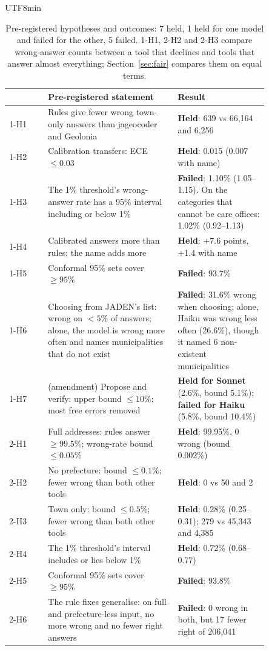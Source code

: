 \documentclass[10pt]{article}
\begin{document}
\begin{CJK}{UTF8}{min}
\begin{table}[t]
\centering\small
\begin{tabular}{@{}l>{\raggedright\arraybackslash}p{0.5\linewidth}>{\raggedright\arraybackslash}p{0.35\linewidth}@{}}
\toprule
& Pre-registered statement & Result \\
\midrule
1-H1 & Rules give fewer wrong town-only answers than jageocoder and Geolonia & \textbf{Held}: 639 vs 66,164 and 6,256 \\
1-H2 & Calibration transfers: ECE $\le 0.03$ & \textbf{Held}: 0.015 (0.007 with name) \\
1-H3 & The 1\% threshold's wrong-answer rate has a 95\% interval including or below 1\% & \textbf{Failed}: 1.10\% (1.05--1.15). On the categories that cannot be care offices: 1.02\% (0.92--1.13) \\
1-H4 & Calibrated answers more than rules; the name adds more & \textbf{Held}: +7.6 points, +1.4 with name \\
1-H5 & Conformal 95\% sets cover $\ge 95\%$ & \textbf{Failed}: 93.7\% \\
1-H6 & Choosing from JADEN's list: wrong on $<5\%$ of answers; alone, the model is wrong more often and names municipalities that do not exist & \textbf{Failed}: 31.6\% wrong when choosing; alone, Haiku was wrong less often (26.6\%), though it named 6 non-existent municipalities \\
1-H7 & (amendment) Propose and verify: upper bound $\le 10\%$; most free errors removed & \textbf{Held for Sonnet} (2.6\%, bound 5.1\%); \textbf{failed for Haiku} (5.8\%, bound 10.4\%) \\
\midrule
2-H1 & Full addresses: rules answer $\ge 99.5\%$; wrong-rate bound $\le 0.05\%$ & \textbf{Held}: 99.95\%, 0 wrong (bound 0.002\%) \\
2-H2 & No prefecture: bound $\le 0.1\%$; fewer wrong than both other tools & \textbf{Held}: 0 vs 50 and 2 \\
2-H3 & Town only: bound $\le 0.5\%$; fewer wrong than both other tools & \textbf{Held}: 0.28\% (0.25--0.31); 279 vs 45,343 and 4,385 \\
2-H4 & The 1\% threshold's interval includes or lies below 1\% & \textbf{Held}: 0.72\% (0.68--0.77) \\
2-H5 & Conformal 95\% sets cover $\ge 95\%$ & \textbf{Failed}: 93.8\% \\
2-H6 & The rule fixes generalise: on full and prefecture-less input, no more wrong and no fewer right answers & \textbf{Failed}: 0 wrong in both, but 17 fewer right of 206,041 \\
\bottomrule
\end{tabular}
\caption{Pre-registered hypotheses and outcomes: 7 held, 1 held for one model and failed for the other,
5 failed. 1-H1, 2-H2 and 2-H3 compare wrong-answer counts between a tool that declines and tools that
answer almost everything; Section~\ref{sec:fair} compares them on equal terms.}
\label{tab:hyp}
\end{table}


\end{CJK}
\end{document}
